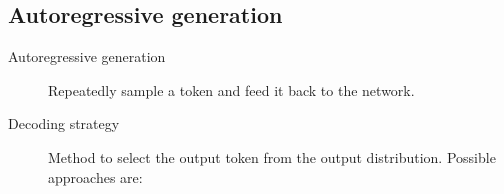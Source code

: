 \subsection{Autoregressive generation}

\begin{description}
    \item[Autoregressive generation] 
        Repeatedly sample a token and feed it back to the network.

    \item[Decoding strategy] 
        Method to select the output token from the output distribution. Possible approaches are:
\end{description}